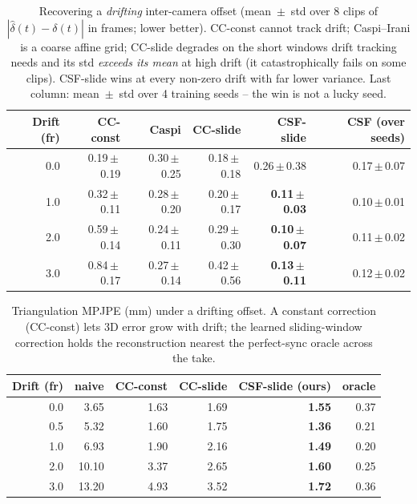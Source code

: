 \begin{table}[t]
\centering
\caption{Recovering a \emph{drifting} inter-camera offset (mean~$\pm$~std over 8 clips of
$|\hat\delta(t)-\delta(t)|$ in frames; lower better). CC-const cannot track drift;
Caspi--Irani is a coarse affine grid; CC-slide degrades on the short windows drift tracking
needs and its std \emph{exceeds its mean} at high drift (it catastrophically fails on some
clips). CSF-slide wins at every non-zero drift with far lower variance. Last column: mean~$\pm$~std
over 4 training seeds -- the win is not a lucky seed.}
\label{tab:b3_drift}
\begin{tabular}{rrrrrr}
\toprule
Drift (fr) & CC-const & Caspi & CC-slide & \textbf{CSF-slide} & CSF (over seeds) \\
\midrule
0.0 & 0.19\,$\pm$\,0.19 & 0.30\,$\pm$\,0.25 & 0.18\,$\pm$\,0.18 & 0.26\,$\pm$\,0.38 & 0.17\,$\pm$\,0.07 \\
1.0 & 0.32\,$\pm$\,0.11 & 0.28\,$\pm$\,0.20 & 0.20\,$\pm$\,0.17 & \textbf{0.11\,$\pm$\,0.03} & 0.10\,$\pm$\,0.01 \\
2.0 & 0.59\,$\pm$\,0.14 & 0.24\,$\pm$\,0.11 & 0.29\,$\pm$\,0.30 & \textbf{0.10\,$\pm$\,0.07} & 0.11\,$\pm$\,0.02 \\
3.0 & 0.84\,$\pm$\,0.17 & 0.27\,$\pm$\,0.14 & 0.42\,$\pm$\,0.56 & \textbf{0.13\,$\pm$\,0.11} & 0.12\,$\pm$\,0.02 \\
\bottomrule
\end{tabular}
\end{table}

\begin{table}[t]
\centering
\caption{Triangulation MPJPE (mm) under a drifting offset. A constant correction
(CC-const) lets 3D error grow with drift; the learned sliding-window correction holds
the reconstruction nearest the perfect-sync oracle across the take.}
\label{tab:b3_drift_mpjpe}
\begin{tabular}{rrrrrr}
\toprule
Drift (fr) & naive & CC-const & CC-slide & \textbf{CSF-slide (ours)} & oracle \\
\midrule
0.0 & 3.65 & 1.63 & 1.69 & \textbf{1.55} & 0.37 \\
0.5 & 5.32 & 1.60 & 1.75 & \textbf{1.36} & 0.21 \\
1.0 & 6.93 & 1.90 & 2.16 & \textbf{1.49} & 0.20 \\
2.0 & 10.10 & 3.37 & 2.65 & \textbf{1.60} & 0.25 \\
3.0 & 13.20 & 4.93 & 3.52 & \textbf{1.72} & 0.36 \\
\bottomrule
\end{tabular}
\end{table}

